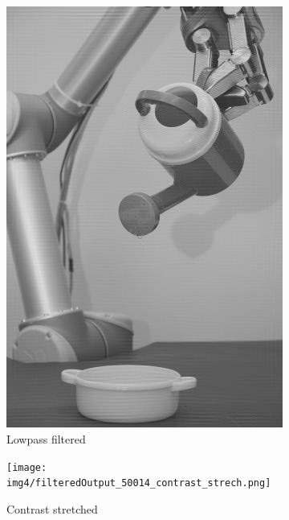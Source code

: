 \begin{figure}[H]
\begin{subfigure}[b]{0.24\textwidth}
        \includegraphics[width=\textwidth]{img4/Image4_2.png}
        \caption{Lowpass filtered}
        \label{fig:img4_src}
    \end{subfigure}
    \begin{subfigure}[b]{0.24\textwidth}
        \texttt{[image: img4/filteredOutput\_50014\_contrast\_strech.png]}
        \caption{Contrast stretched}
        \label{fig:img4_hist}
    \end{subfigure}	
\begin{subfigure}[b]{0.24\textwidth}

\end{subfigure}
\end{figure}
